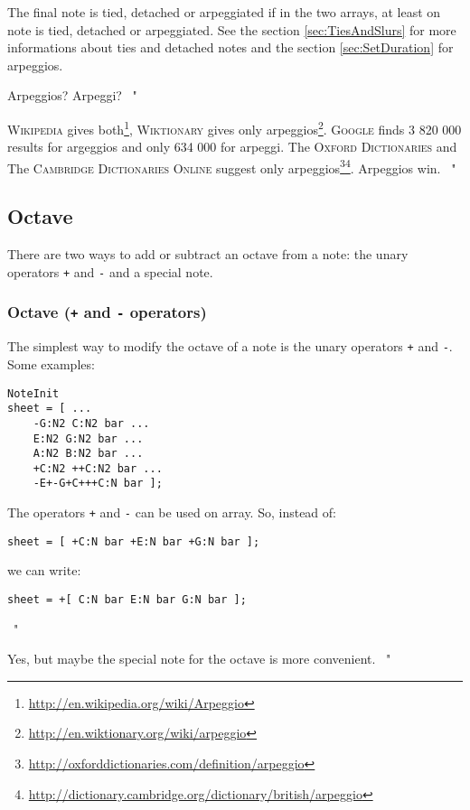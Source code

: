 \documentclass{article}
\newcommand\wikipedia{\textsc{Wikipedia}\xspace}
\newcommand\wiktionary{\textsc{Wiktionary}\xspace}
\newcommand\google{\textsc{Google}\xspace}
\newcommand\footurl[1]{\footnote{\url{#1}}\xspace}
\newenvironment{meenv}{ \par \noindent \makebox[6em][r]{ \textcolor{mecolor}{Me}: " --~}}{~"}
\newenvironment{myselfenv}{ \par \noindent \makebox[6em][r]{ \textcolor{myselfcolor}{Myself}: " --~}}{~"}
\newcommand{ \me }[1]{%
\begin{meenv}%
	#1%
\end{meenv} }
\newcommand{ \myself }[1]{%
\begin{myselfenv}%
	#1%
\end{myselfenv} }
\begin{document}
The final note is tied, detached or arpeggiated if in the two arrays, at least on note is tied, detached or arpeggiated. See the section \ref{sec:TiesAndSlurs} for more informations about ties and detached notes and the section \ref{sec:SetDuration} for arpeggios.

\me{Arpeggios? Arpeggi?}
\myself{\wikipedia gives both\footurl{http://en.wikipedia.org/wiki/Arpeggio}, \wiktionary gives only arpeggios\footurl{http://en.wiktionary.org/wiki/arpeggio}. \google finds 3 820 000 results for argeggios and only 634 000 for arpeggi. The \textsc{Oxford Dictionaries} and The \textsc{Cambridge Dictionaries Online} suggest only arpeggios\footurl{http://oxforddictionaries.com/definition/arpeggio}\footurl{http://dictionary.cambridge.org/dictionary/british/arpeggio}. Arpeggios win.}

\subsection{Octave}
\label{sec:Octave}

There are two ways to add or subtract an octave from a note: the unary operators \lstinline!+! and \lstinline!-! and a special note.

\subsubsection{Octave (\lstinline!+! and \lstinline!-! operators)}
\label{sec:OctaveOperators}

The simplest way to modify the octave of a note is the unary operators \lstinline!+! and \lstinline!-!. Some examples: \\

\begin{lstlisting}
NoteInit
sheet = [ ...
	-G:N2 C:N2 bar ...
	E:N2 G:N2 bar ...
	A:N2 B:N2 bar ...
	+C:N2 ++C:N2 bar ...
	-E+-G+C+++C:N bar ];
\end{lstlisting}

\begin{meenv}%
The operators \lstinline!+! and \lstinline!-! can be used on array. So, instead of:
\begin{lstlisting}
sheet = [ +C:N bar +E:N bar +G:N bar ];
\end{lstlisting}
we can write:
\begin{lstlisting}
sheet = +[ C:N bar E:N bar G:N bar ];
\end{lstlisting}%
\end{meenv}
\myself{Yes, but maybe the special note for the octave is more convenient.}
\end{document}
